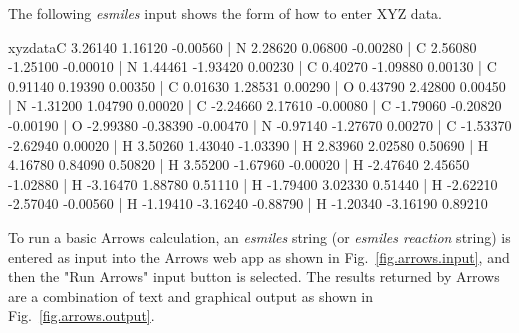 \documentclass[runningheads,a4paper]{llncs}
\begin{document}
The following \textit{esmiles} input shows the form of how to enter XYZ data.

\small
\begin{center}
\begin{boxedverbatim}
xyzdata{C     3.26140    1.16120   -0.00560 |
N     2.28620    0.06800   -0.00280 | C     2.56080   -1.25100   -0.00010 | 
N     1.44461   -1.93420    0.00230 | C     0.40270   -1.09880    0.00130 | 
C     0.91140    0.19390    0.00350 | C     0.01630    1.28531    0.00290 | 
O     0.43790    2.42800    0.00450 | N    -1.31200    1.04790    0.00020 | 
C    -2.24660    2.17610   -0.00080 | C    -1.79060   -0.20820   -0.00190 |
O    -2.99380   -0.38390   -0.00470 | N    -0.97140   -1.27670    0.00270 | 
C    -1.53370   -2.62940    0.00020 | H     3.50260    1.43040   -1.03390 | 
H     2.83960    2.02580    0.50690 | H     4.16780    0.84090    0.50820 | 
H     3.55200   -1.67960   -0.00020 | H    -2.47640    2.45650   -1.02880 | 
H    -3.16470    1.88780    0.51110 | H    -1.79400    3.02330    0.51440 | 
H    -2.62210   -2.57040   -0.00560 | H    -1.19410   -3.16240   -0.88790 | 
H    -1.20340   -3.16190    0.89210}
\end{boxedverbatim}
\end{center}
\normalsize

To run a basic Arrows calculation, an \textit{esmiles} string (or \textit{esmiles reaction} string) is entered as input into the Arrows web app as shown  in Fig.~\ref{fig.arrows.input}, and then the "Run Arrows" input button is selected. The results returned by Arrows are a combination of text and graphical output as shown in Fig.~\ref{fig.arrows.output}.
\end{document}
